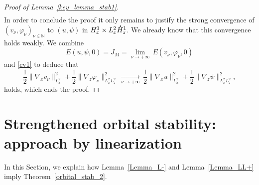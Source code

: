 \documentclass[10pt]{amsart}
\theoremstyle{definition}
\newcommand*{\overbigdot}[1]{%
\accentset{\mbox{\large\bfseries .}}{#1}}
\newenvironment{ProofOf}[1]{\begin{proof}[Proof of #1]}{\end{proof}}
\begin{document}
\begin{ProofOf}{Lemma~\ref{key_lemma_stab1}}
\begin{multline*}
\end{multline*}
\egroup
In order to conclude the proof it only remains to justify the strong convergence of $(v_{\nu},\varphi_{\nu})_{\nu\in\mathbb N}$ to $(u,\psi)$ in $H_{x}^{1}\times L_{x}^{2}\overbigdot{H}_{z}^{1}$. We already know that this convergence holds weakly. We combine
\[
E(u,\psi,0)=J_{M}=\underset{\nu\to+\infty}{\lim}\,E(v_{\nu},\varphi_{\nu},0)
\]
and \eqref{cv1} to deduce that
\[
\frac{1}{2}\|\nabla_{x}v_{\nu}\|_{L_{x}^{2}}^{2}+\frac{1}{2}\|\nabla_{z}\varphi_{\nu}\|_{L_{x}^{2}L_{z}^{2}}^{2}\,\underset{\nu\to+\infty}{\to}\,\frac{1}{2}\|\nabla_{x}u\|_{L_{x}^{2}}^{2}+\frac{1}{2}\|\nabla_{z}\psi\|_{L_{x}^{2}L_{z}^{2}}^{2},
\]
holds, which ends the proof.
\end{ProofOf}

\section{Strengthened orbital stability: approach by linearization}\label{OrbitalStability2}

In this Section, we explain how Lemma~\ref{Lemma_L-} and Lemma~\ref{Lemma_LL+} imply Theorem~\ref{orbital_stab_2}.
\end{document}
